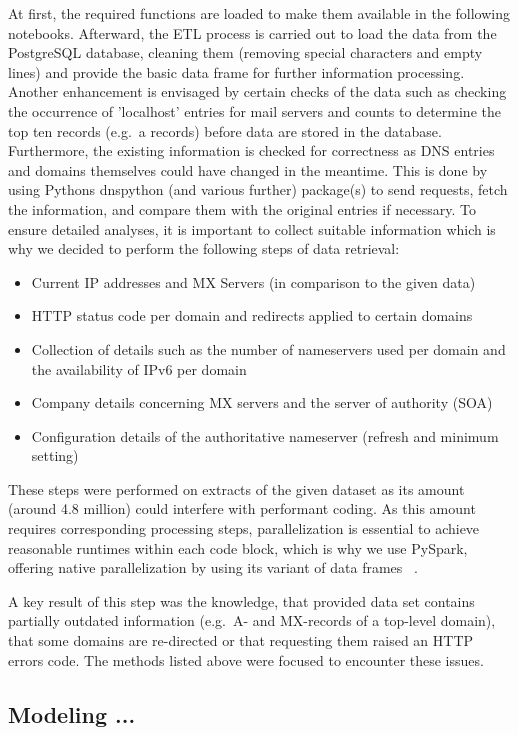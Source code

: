 At first, the required functions are loaded to make them available in the following notebooks.
Afterward, the ETL process is carried out to load the data from the PostgreSQL database, cleaning them (removing special characters and empty lines) and provide the basic data frame for further information processing.
Another enhancement is envisaged by certain checks of the data such as checking the occurrence of 'localhost' entries for mail servers and counts to determine the top ten records (e.g.\ a records) before data are stored in the database.
Furthermore, the existing information is checked for correctness as DNS entries and domains themselves could have changed in the meantime.
This is done by using Pythons dnspython (and various further) package(s) to send requests, fetch the information, and compare them with the original entries if necessary.
To ensure detailed analyses, it is important to collect suitable information which is why we decided to perform the following steps of data retrieval:
\begin{itemize}
    \item Current IP addresses and MX Servers (in comparison to the given data)
    \item HTTP status code per domain and redirects applied to certain domains
    \item Collection of details such as the number of nameservers used per domain and the availability of IPv6 per domain
    \item Company details concerning MX servers and the server of authority (SOA)
    \item Configuration details of the authoritative nameserver (refresh and minimum setting)
\end{itemize}
These steps were performed on extracts of the given dataset as its amount (around 4.8 million) could interfere with performant coding.
As this amount requires corresponding processing steps, parallelization is essential to achieve reasonable runtimes within each code block, which is why we use PySpark, offering native parallelization by using its variant of data frames~\autocite[cf.][]{Weber.21.1.2019} .

A key result of this step was the knowledge, that provided data set contains partially outdated information (e.g.\ A- and MX-records of a top-level domain), that some domains are re-directed or that requesting them raised an HTTP errors code.
The methods listed above were focused to encounter these issues.


\subsection{Modeling ...}\label{subsec:modeling}
